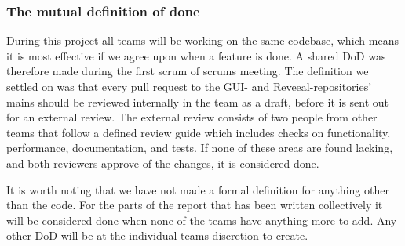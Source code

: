 \subsubsection{The mutual definition of done}
During this project all teams will be working on the same codebase, which means it is most effective if we agree upon when a feature is done.
A shared DoD was therefore made during the first scrum of scrums meeting.
The definition we settled on was that every pull request to the GUI- and Reveeal-repositories' mains should be reviewed internally in the team as a draft, before it is sent out for an external review.
The external review consists of two people from other teams that follow a defined review guide which includes checks on functionality, performance, documentation, and tests. 
If none of these areas are found lacking, and both reviewers approve of the changes, it is considered done.

It is worth noting that we have not made a formal definition for anything other than the code. For the parts of the report that has been written collectively it will be considered done when none of the teams have anything more to add.
Any other DoD will be at the individual teams discretion to create.



